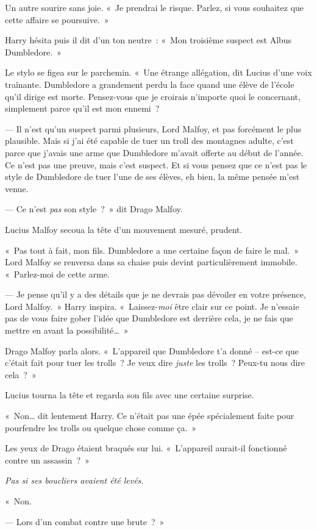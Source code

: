 Un autre sourire sans joie. «~Je prendrai le risque. Parlez, si vous souhaitez que cette affaire se poursuive.~»

Harry hésita puis il dit d'un ton neutre~: «~Mon troisième suspect est Albus Dumbledore.~»

Le stylo se figea sur le parchemin. «~Une étrange allégation, dit Lucius d'une voix traînante. Dumbledore a grandement perdu la face quand une élève de l'école qu'il dirige est morte. Pensez-vous que je croirais n'importe quoi le concernant, simplement parce qu'il est mon ennemi~?

--- Il n'est qu'un suspect parmi plusieurs, Lord Malfoy, et pas forcément le plus plausible. Mais si j'ai été capable de tuer un troll des montagnes adulte, c'est parce que j'avais une arme que Dumbledore m'avait offerte au début de l'année. Ce n'est pas une preuve, mais c'est suspect. Et si vous pensez que ce n'est pas le style de Dumbledore de tuer l'une de ses élèves, eh bien, la même pensée m'est venue.

--- Ce n'est \emph{pas} son style~?~» dit Drago Malfoy.

Lucius Malfoy secoua la tête d'un mouvement mesuré, prudent.

«~Pas tout à fait, mon fils. Dumbledore a une certaine façon de faire le mal.~» Lord Malfoy se renversa dans sa chaise puis devint particulièrement immobile. «~Parlez-moi de cette arme.

--- Je pense qu'il y a des détails que je ne devrais pas dévoiler en votre présence, Lord Malfoy.~» Harry inspira. «~Laissez-\emph{moi} être clair sur ce point. Je n'essaie pas de vous faire gober l'idée que Dumbledore est derrière cela, je ne fais que mettre en avant la possibilité…~»

Drago Malfoy parla alors. «~L'appareil que Dumbledore t'a donné -- est-ce que c'était fait pour tuer les trolls~? Je veux dire \emph{juste} les trolls~? Peux-tu nous dire cela~?~»

Lucius tourna la tête et regarda son fils avec une certaine surprise.

«~Non… dit lentement Harry. Ce n'était pas une épée spécialement faite pour pourfendre les trolls ou quelque chose comme ça.~»

Les yeux de Drago étaient braqués sur lui. «~L'appareil aurait-il fonctionné contre un assassin~?~»

\emph{Pas si ses boucliers avaient été levés.}

«~Non.

--- Lors d'un combat contre une brute~?~»


